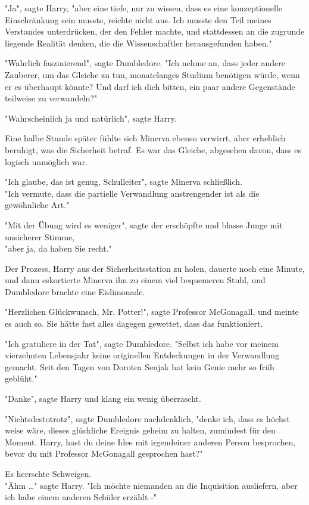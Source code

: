 {"Ja", sagte Harry, "aber eine tiefe, nur zu wissen, dass es eine konzeptionelle Einschränkung sein musste, reichte nicht aus. Ich musste den Teil meines Verstandes unterdrücken, der den Fehler machte, und stattdessen an die zugrunde liegende Realität denken, die die Wissenschaftler herausgefunden haben."

"Wahrlich faszinierend", sagte Dumbledore. "Ich nehme an, dass jeder andere Zauberer, um das Gleiche zu tun, monatelanges Studium benötigen würde, wenn er es überhaupt könnte? Und darf ich dich bitten, ein paar andere Gegenstände teilweise zu verwandeln?"

"Wahrscheinlich ja und natürlich", sagte Harry.

Eine halbe Stunde später fühlte sich Minerva ebenso verwirrt, aber erheblich beruhigt, was die Sicherheit betraf. Es war das Gleiche, abgesehen davon, dass es logisch unmöglich war.

"Ich glaube, das ist genug, Schulleiter", sagte Minerva schließlich.\\ "Ich vermute, dass die partielle Verwandlung anstrengender ist als die gewöhnliche Art."

"Mit der Übung wird es weniger", sagte der erschöpfte und blasse Junge mit unsicherer Stimme,\\ "aber ja, da haben Sie recht."

Der Prozess, Harry aus der Sicherheitsstation zu holen, dauerte noch eine Minute, und dann eskortierte Minerva ihn zu einem viel bequemeren Stuhl, und Dumbledore brachte eine Eislimonade.

"Herzlichen Glückwunsch, Mr. Potter!", sagte Professor McGonagall, und meinte es auch so. Sie hätte fast alles dagegen gewettet, dass das funktioniert.

"Ich gratuliere in der Tat", sagte Dumbledore. "Selbst ich habe vor meinem vierzehnten Lebensjahr keine originellen Entdeckungen in der Verwandlung gemacht. Seit den Tagen von Dorotea Senjak hat kein Genie mehr so früh geblüht."

"Danke", sagte Harry und klang ein wenig überrascht.

"Nichtsdestotrotz", sagte Dumbledore nachdenklich, "denke ich, dass es höchst weise wäre, dieses glückliche Ereignis geheim zu halten, zumindest für den Moment. Harry, hast du deine Idee mit irgendeiner anderen Person besprochen, bevor du mit Professor McGonagall gesprochen hast?"

Es herrschte Schweigen.\\ "Ähm …" sagte Harry. "Ich möchte niemanden an die Inquisition ausliefern, aber ich habe einem anderen Schüler erzählt -"

}
